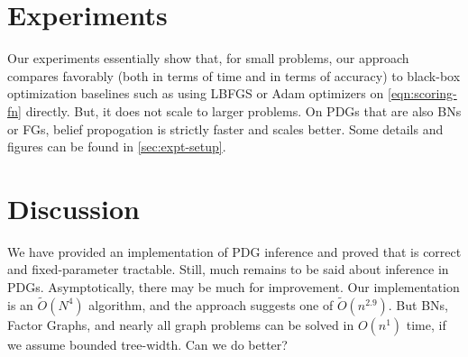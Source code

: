 \documentclass{article}
\begin{document}
%
%
\section{Experiments} \label{sec:expts}
Our experiments essentially show that, for small problems,
 our approach compares favorably (both in terms of time and in terms of accuracy) to black-box optimization baselines such as using LBFGS or Adam optimizers on \cref{eqn:scoring-fn} directly.
But, it does not scale to larger problems. 
On PDGs that are also BNs or FGs, belief propogation is strictly faster and scales better.  
Some details and figures can be found in \cref{sec:expt-setup}.

\TODO



\section{Discussion}

We have provided an implementation of PDG inference and proved that is correct and fixed-parameter tractable. 
Still, much remains to be said about inference in PDGs. 
Asymptotically, there may be much for improvement. Our implementation is an $\tilde O(N^4)$ algorithm, and the approach suggests one of $\tilde O(n^{2.9})$. 
 But BNs, Factor Graphs, and nearly all graph problems can be solved in $O(n^1)$ time, if we assume bounded tree-width. Can we do better?
\end{document}
